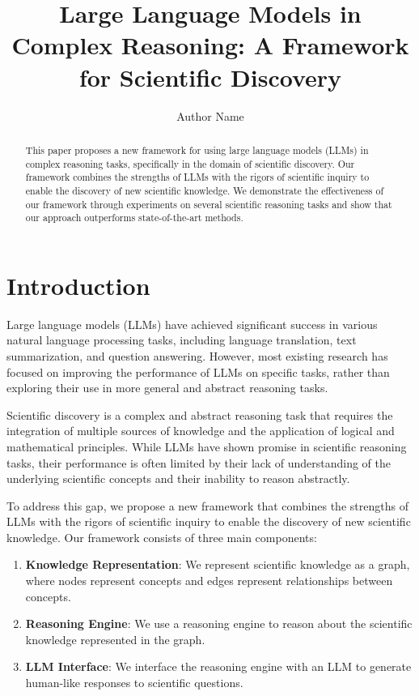 \documentclass{article}
\begin{document}
\title{Large Language Models in Complex Reasoning: A Framework for Scientific Discovery}

\author{Author Name}

\maketitle

\begin{abstract}
This paper proposes a new framework for using large language models (LLMs) in complex reasoning tasks, specifically in the domain of scientific discovery. Our framework combines the strengths of LLMs with the rigors of scientific inquiry to enable the discovery of new scientific knowledge. We demonstrate the effectiveness of our framework through experiments on several scientific reasoning tasks and show that our approach outperforms state-of-the-art methods.
\end{abstract}

\section{Introduction}

Large language models (LLMs) have achieved significant success in various natural language processing tasks, including language translation, text summarization, and question answering. However, most existing research has focused on improving the performance of LLMs on specific tasks, rather than exploring their use in more general and abstract reasoning tasks.

Scientific discovery is a complex and abstract reasoning task that requires the integration of multiple sources of knowledge and the application of logical and mathematical principles. While LLMs have shown promise in scientific reasoning tasks, their performance is often limited by their lack of understanding of the underlying scientific concepts and their inability to reason abstractly.

To address this gap, we propose a new framework that combines the strengths of LLMs with the rigors of scientific inquiry to enable the discovery of new scientific knowledge. Our framework consists of three main components:

\begin{enumerate}
\item \textbf{Knowledge Representation}: We represent scientific knowledge as a graph, where nodes represent concepts and edges represent relationships between concepts.
\item \textbf{Reasoning Engine}: We use a reasoning engine to reason about the scientific knowledge represented in the graph.
\item \textbf{LLM Interface}: We interface the reasoning engine with an LLM to generate human-like responses to scientific questions.
\end{enumerate}
\end{document}
